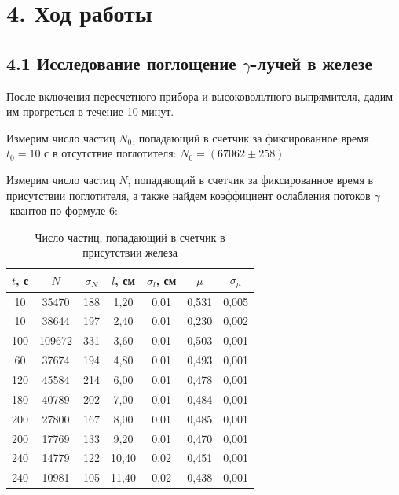 \documentclass[a4paper,12pt]{report}
\begin{document}
\section*{4. Ход работы}
\subsection*{4.1 Исследование поглощение $\gamma$-лучей в железе}

После включения пересчетного прибора и высоковольтного выпрямителя, дадим им прогреться в течение 10 минут.

Измерим число частиц $N_{0}$, попадающий в счетчик за фиксированное время $t_{0} = 10$ с в отсутствие поглотителя: $N_{0} = (67062\pm258)$

Измерим число частиц $N$, попадающий в счетчик за фиксированное время в присутствии поглотителя, а также найдем коэффициент ослабления потоков $\gamma$-квантов по формуле 6:

\begin{table}[H]
\begin{tabular}{|c|c|c|c|c|c|c|}
\hline
$t$, с & $N$      & $\sigma_{N}$ & $l$, см & $\sigma_{l}$, см & $\mu$    & $\sigma_{\mu}$ \\ \hline
10   & 35470  & 188          & 1,20  & 0,01             & 0,531 & 0,005    \\ \hline
10   & 38644  & 197          & 2,40  & 0,01             & 0,230 & 0,002    \\ \hline
100  & 109672 & 331          & 3,60  & 0,01             & 0,503 & 0,001    \\ \hline
60   & 37674  & 194          & 4,80  & 0,01             & 0,493 & 0,001    \\ \hline
120  & 45584  & 214          & 6,00  & 0,01             & 0,478 & 0,001    \\ \hline
180  & 40789  & 202          & 7,00  & 0,01             & 0,484 & 0,001    \\ \hline
200  & 27800  & 167          & 8,00  & 0,01             & 0,485 & 0,001    \\ \hline
200  & 17769  & 133          & 9,20  & 0,01             & 0,470 & 0,001    \\ \hline
240  & 14779  & 122          & 10,40 & 0,02             & 0,451 & 0,001    \\ \hline
240  & 10981  & 105          & 11,40 & 0,02             & 0,438 & 0,001    \\ \hline
\end{tabular}
\caption{Число частиц, попадающий в счетчик в присутствии железа}
\end{table}
\end{document}
